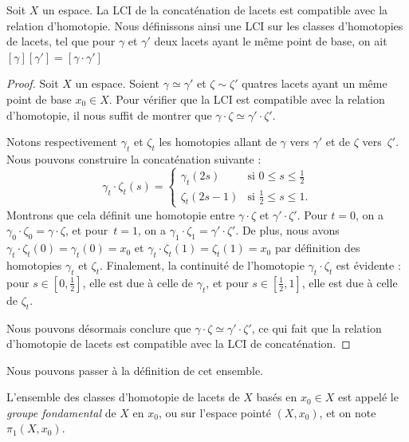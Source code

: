 \begin{proposition}
Soit $X$ un espace. La LCI de la concaténation de lacets est compatible avec la relation d'homotopie. Nous définissons ainsi une LCI sur les classes d'homotopies de lacets, tel que pour $\gamma$ et $\gamma'$ deux lacets ayant le même point de base, on ait $[\gamma][\gamma']=[\gamma\cdot\gamma']$
\end{proposition}
\begin{proof}
Soit $X$ un espace. Soient $\gamma\simeq\gamma'$ et $\zeta\sim\zeta'$ quatres lacets ayant un même point de base $x_0\in X$. Pour vérifier que la LCI est compatible avec la relation d'homotopie, il nous suffit de montrer que $\gamma\cdot\zeta\simeq\gamma'\cdot\zeta'$.

Notons respectivement $\gamma_t$ et $\zeta_t$ les homotopies allant de $\gamma$ vers $\gamma'$ et de $\zeta$ vers~$\zeta'$. Nous pouvons construire la concaténation suivante : \begin{equation}\label{eq:homotopy-concatenate}
\gamma_t\cdot\zeta_t(s)=\left\{\begin{matrix}
\gamma_t(2s)&\text{si }0\leq s\leq \frac{1}{2}\\ 
\zeta_t(2s-1)&\text{si }\frac{1}{2}\leq s\leq 1.
\end{matrix}\right.
\end{equation}Montrons que cela définit une homotopie entre $\gamma\cdot\zeta$ et $\gamma'\cdot\zeta'$. Pour $t=0$, on a $\gamma_0\cdot\zeta_0=\gamma\cdot\zeta$, et pour~$t=1$, on a $\gamma_1\cdot\zeta_1=\gamma'\cdot\zeta'$. De plus, nous avons $\gamma_t\cdot\zeta_t(0)=\gamma_t(0)=x_0$ et $\gamma_t\cdot\zeta_t(1)=\zeta_t(1)=x_0$ par définition des homotopies $\gamma_t$ et $\zeta_t$. Finalement, la continuité de l'homotopie $\gamma_t\cdot\zeta_t$ est évidente : pour $s\in[0,\frac{1}{2}]$, elle est due à celle de $\gamma_t$, et pour $s\in[\frac{1}{2},1]$, elle est due à celle de $\zeta_t$.

Nous pouvons désormais conclure que $\gamma\cdot\zeta\simeq\gamma'\cdot\zeta'$, ce qui fait que la relation d'homotopie de lacets est compatible avec la LCI de concaténation.
\end{proof}

Nous pouvons passer à la définition de cet ensemble.

\begin{definition}
L'ensemble des classes d'homotopie de lacets de $X$ basés en $x_0\in X$ est appelé le \emph{groupe fondamental} de $X$ en $x_0$, ou sur l'espace pointé $(X,x_0)$, et on note $\pi_1(X,x_0)$.
\end{definition}

